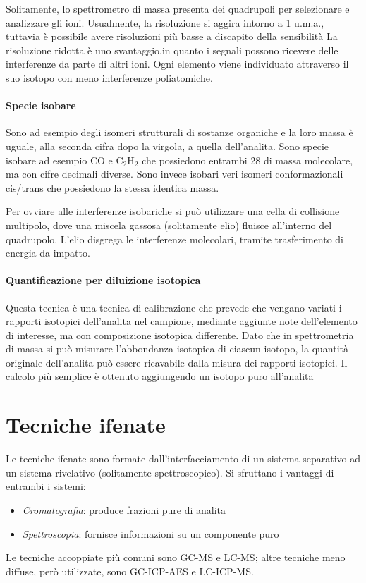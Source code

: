 
Solitamente, lo spettrometro di massa presenta dei quadrupoli per selezionare e analizzare gli ioni.
Usualmente, la risoluzione si aggira intorno a 1 u.m.a., tuttavia è possibile avere risoluzioni più basse a discapito della sensibilità
La risoluzione ridotta è uno svantaggio,in quanto i segnali possono ricevere delle interferenze da parte di altri ioni.
Ogni elemento viene individuato attraverso il suo isotopo con meno interferenze poliatomiche.


\paragraph{Specie isobare}
Sono ad esempio degli isomeri strutturali di sostanze organiche e la loro massa è uguale, alla seconda cifra dopo la virgola, a quella dell’analita.
Sono specie isobare ad esempio CO e C$_2$H$_2$ che possiedono entrambi 28 di massa molecolare, ma con cifre decimali diverse.
Sono invece isobari veri isomeri conformazionali cis/trans che possiedono la stessa identica massa.

Per ovviare alle interferenze isobariche si può utilizzare una cella di collisione multipolo, dove una miscela gassosa (solitamente elio) fluisce all'interno del quadrupolo.
L'elio disgrega le interferenze molecolari, tramite trasferimento di energia da impatto.

\paragraph{Quantificazione per diluizione isotopica}
Questa tecnica è una tecnica di calibrazione che prevede che vengano variati i rapporti isotopici dell'analita nel campione, mediante aggiunte note dell'elemento di interesse, ma con composizione isotopica differente.
Dato che in spettrometria di massa si può misurare l'abbondanza isotopica di ciascun isotopo, la quantità originale dell'analita può essere ricavabile dalla misura dei rapporti isotopici.
Il calcolo più semplice è ottenuto aggiungendo un isotopo puro all'analita

\section{Tecniche ifenate}
Le tecniche ifenate sono formate dall'interfacciamento di un sistema separativo ad un sistema rivelativo (solitamente spettroscopico).
Si sfruttano i vantaggi di entrambi i sistemi:
\begin{itemize}
\item \textit{Cromatografia}: produce frazioni pure di analita
\item \textit{Spettroscopia}: fornisce informazioni su un componente puro
\end{itemize}
Le tecniche accoppiate più comuni sono GC-MS e LC-MS; altre tecniche meno diffuse, però utilizzate, sono GC-ICP-AES e LC-ICP-MS.

